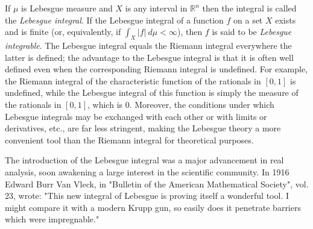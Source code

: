 \documentclass{article}
\newcommand{\1}{{{\bf 1}}}
\begin{document}
If $\mu$ is Lebesgue measure and $X$ is any interval in $\mathbb{R}^{n}$ then the integral is called the \emph{Lebesgue integral}.  If the Lebesgue integral of a function $f$ on a set $X$ exists and is finite (or, equivalently, if $\int_X |f|\ d\mu < \infty$), then $f$ is said to be \emph{Lebesgue integrable}.  The Lebesgue integral equals the Riemann integral everywhere the latter is defined; the advantage to the Lebesgue integral is that it is often well defined even when the corresponding Riemann integral is undefined. For example, the Riemann integral of the characteristic function of the rationals in $[0,1]$ is undefined, while the Lebesgue integral of this function is simply the measure of the rationals in $[0,1]$, which is 0. Moreover, the conditions under which Lebesgue integrals may be exchanged with each other or with limits or derivatives, etc., are far less stringent, making the Lebesgue theory a more convenient tool than the Riemann integral for theoretical purposes.

The introduction of the Lebesgue integral was a major advancement in real analysis, soon awakening a large interest in the scientific community. In 1916 Edward Burr Van Vleck, in "Bulletin of the American Mathematical Society", vol. 23, wrote: "This new integral of Lebesgue is proving itself a wonderful tool. I might compare it with a modern Krupp gun, so easily does it penetrate barriers which were impregnable."
\end{document}
